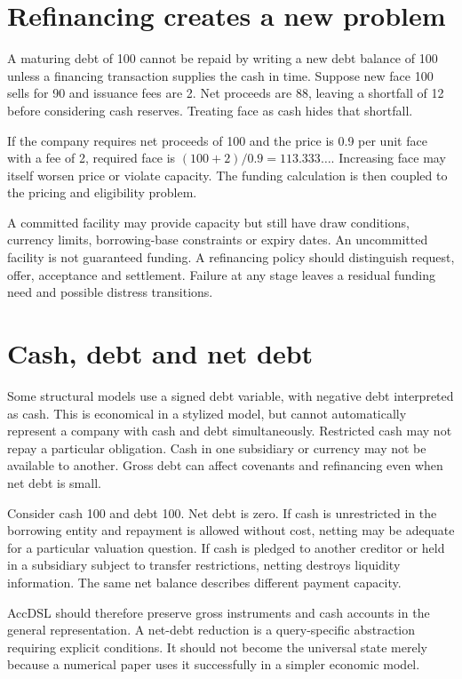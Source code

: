 \section{Refinancing creates a new problem}
A maturing debt of 100 cannot be repaid by writing a new debt balance of 100 unless a financing transaction supplies the cash in time. Suppose new face 100 sells for 90 and issuance fees are 2. Net proceeds are 88, leaving a shortfall of 12 before considering cash reserves. Treating face as cash hides that shortfall.

If the company requires net proceeds of 100 and the price is 0.9 per unit face with a fee of 2, required face is $(100+2)/0.9=113.333\ldots$. Increasing face may itself worsen price or violate capacity. The funding calculation is then coupled to the pricing and eligibility problem.

A committed facility may provide capacity but still have draw conditions, currency limits, borrowing-base constraints or expiry dates. An uncommitted facility is not guaranteed funding. A refinancing policy should distinguish request, offer, acceptance and settlement. Failure at any stage leaves a residual funding need and possible distress transitions.

\section{Cash, debt and net debt}
Some structural models use a signed debt variable, with negative debt interpreted as cash. This is economical in a stylized model, but cannot automatically represent a company with cash and debt simultaneously. Restricted cash may not repay a particular obligation. Cash in one subsidiary or currency may not be available to another. Gross debt can affect covenants and refinancing even when net debt is small.

Consider cash 100 and debt 100. Net debt is zero. If cash is unrestricted in the borrowing entity and repayment is allowed without cost, netting may be adequate for a particular valuation question. If cash is pledged to another creditor or held in a subsidiary subject to transfer restrictions, netting destroys liquidity information. The same net balance describes different payment capacity.

AccDSL should therefore preserve gross instruments and cash accounts in the general representation. A net-debt reduction is a query-specific abstraction requiring explicit conditions. It should not become the universal state merely because a numerical paper uses it successfully in a simpler economic model.

